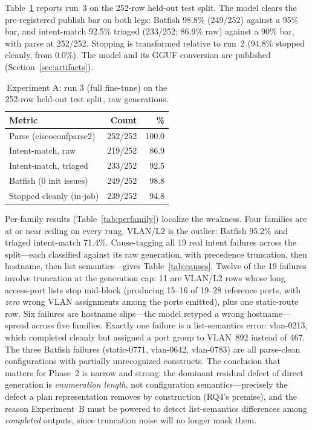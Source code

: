 \documentclass[conference]{IEEEtran}
\begin{document}
Table~\ref{tab:expa} reports run~3 on the 252-row held-out test split. The model clears the pre-registered publish bar on both legs: Batfish 98.8\% (249/252) against a 95\% bar, and intent-match 92.5\% triaged (233/252; 86.9\% raw) against a 90\% bar, with parse at 252/252. Stopping is transformed relative to run~2 (94.8\% stopped cleanly, from 0.0\%). The model and its GGUF conversion are published (Section~\ref{sec:artifacts}).

\begin{table}[t]
\centering
\caption{Experiment A: run 3 (full fine-tune) on the 252-row held-out test split, raw generations.}
\label{tab:expa}
\small
\begin{tabular}{@{}lrr@{}}
\toprule
\textbf{Metric} & \textbf{Count} & \textbf{\%} \\
\midrule
Parse (ciscoconfparse2) & 252/252 & 100.0 \\
Intent-match, raw & 219/252 & 86.9 \\
Intent-match, triaged & 233/252 & 92.5 \\
Batfish (0 init issues) & 249/252 & 98.8 \\
Stopped cleanly (in-job) & 239/252 & 94.8 \\
\bottomrule
\end{tabular}
\end{table}

Per-family results (Table~\ref{tab:perfamily}) localize the weakness. Four families are at or near ceiling on every rung. VLAN/L2 is the outlier: Batfish 95.2\% and triaged intent-match 71.4\%. Cause-tagging all 19 real intent failures across the split---each classified against its raw generation, with precedence truncation, then hostname, then list semantics---gives Table~\ref{tab:causes}. Twelve of the 19 failures involve truncation at the generation cap: 11 are VLAN/L2 rows whose long access-port lists stop mid-block (producing 15--16 of 19--28 reference ports, with \emph{zero} wrong VLAN assignments among the ports emitted), plus one static-route row. Six failures are hostname slips---the model retyped a wrong hostname---spread across five families. Exactly one failure is a list-semantics error: vlan-0213, which completed cleanly but assigned a port group to VLAN~892 instead of 467. The three Batfish failures (static-0771, vlan-0642, vlan-0783) are all parse-clean configurations with partially unrecognized constructs. The conclusion that matters for Phase~2 is narrow and strong: the dominant residual defect of direct generation is \emph{enumeration length}, not configuration semantics---precisely the defect a plan representation removes by construction (RQ4's premise), and the reason Experiment~B must be powered to detect list-semantics differences among \emph{completed} outputs, since truncation noise will no longer mask them.
\end{document}
